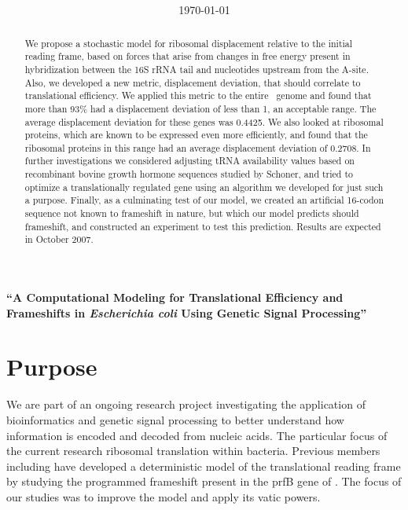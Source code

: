 \documentclass[12pt]{article}
\author{\sc{\BWFauthors}}
\date{{\sc \today}}
\title{\bf{\BWFtitle{\emph}}}
\newcommand{\BWFtitle}[1]{A Computational Modeling for Translational
  Efficiency and Frameshifts in #1{Escherichia coli} Using Genetic Signal
  Processing}
\begin{document}
\begin{singlespace}
  \maketitle
  \tableofcontents
\end{singlespace}

\clearpage
\begin{center}
\textbf{``\BWFtitle{\emph}''}
\end{center}
\begin{abstract}\begin{normalsize}
  We propose a stochastic model
  for ribosomal displacement relative to the initial reading frame, based 
  on forces that arise from changes in free energy present in hybridization 
  between the 16S rRNA tail and nucleotides upstream from the A-site. Also, 
  we developed a new metric, displacement deviation, that should correlate 
  to   translational efficiency. We applied this metric to the entire 
  \ecoli\ genome and found that more than 93\% had a displacement deviation 
  of less than 1, an acceptable range. The average displacement deviation 
  for these genes was 0.4425.  We also looked at ribosomal proteins, which 
  are known to be expressed even more efficiently, and found that the 
  ribosomal proteins in this range had an average displacement deviation of
  0.2708. In further investigations we considered adjusting tRNA 
  availability values based on recombinant bovine growth hormone sequences 
  studied by Schoner, and tried to optimize a translationally regulated 
  gene using an algorithm we developed for just such a purpose. Finally, as 
  a culminating test of our model, we created an artificial 16-codon 
  sequence not known to frameshift in nature, but which our model predicts 
  should frameshift, and constructed an experiment to test this prediction. 
  Results are expected in October 2007.

\end{normalsize}\end{abstract}  
  
\clearpage
{}

\section{Purpose}
We are part of an ongoing research project
investigating the application of bioinformatics
and genetic signal processing to better understand how
information is encoded and decoded from nucleic acids.  The particular
focus of the current research ribosomal translation within
bacteria.  Previous members including \citeauthor{lalit:mechanics}
have developed a deterministic model
of the translational reading frame by studying the
programmed frameshift present in the prfB gene of \ecoli.  The focus
of our studies was to improve the model and apply its vatic powers.
\end{document}
